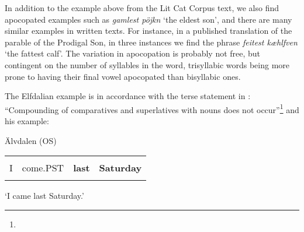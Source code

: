 \begin{styleBodytextC}
In addition to the example above from the Lit Cat Corpus text, we also find apocopated examples such as \textit{gamlest pöjkn} ‘the eldest son’, and there are many similar examples in written texts. For instance, in a published translation of the parable of the Prodigal Son, in three instances we find the phrase \textit{feitest kæhlfven} ‘the fattest calf’. The variation in apocopation is probably not free, but contingent on the number of syllables in the word, trisyllabic words being more prone to having their final vowel apocopated than bisyllabic ones. 

\end{styleBodytextC}

\begin{styleBodytextC}
The Elfdalian example is in accordance with the terse statement in \citet[57]{Levander1909}: “Compounding of comparatives and superlatives with nouns does not occur”\footnote{} and his example:

\end{styleBodytextC}


\begin{listWWNumileveli}
\item {}

\begin{styleExample}
Älvdalen (OS)

\end{styleExample}

\end{listWWNumileveli}

\begin{tabular}{llll}
\lsptoprule
\multicolumn{4}{l}{I

}\\
I & come.PST & {\bfseries last} & {\bfseries Saturday}\\
\lspbottomrule
\end{tabular}

\begin{styleTranslation}
‘I came last Saturday.’

\end{styleTranslation}


